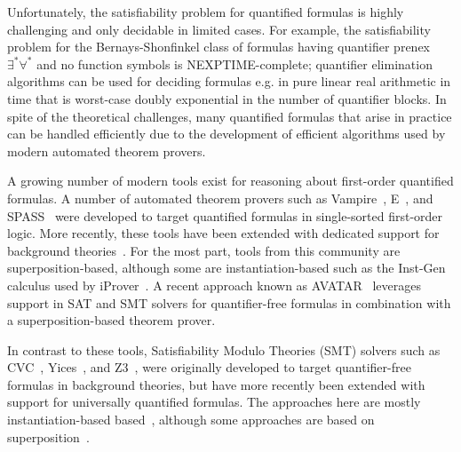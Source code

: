 \documentclass[oribibl]{llncs}
\begin{document}
Unfortunately, the satisfiability problem for quantified formulas is highly challenging 
and only decidable in limited cases.
For example,
the satisfiability problem for the Bernays-Shonfinkel class of formulas
having quantifier prenex $\exists^\ast \forall^\ast$ and no function symbols
is NEXPTIME-complete;
quantifier elimination algorithms can be used for deciding 
formulas e.g. in pure linear real arithmetic in time that is worst-case doubly exponential in the number of quantifier blocks.
In spite of the theoretical challenges, many quantified formulas that arise in practice
can be handled efficiently due to the development of efficient algorithms used by modern automated theorem provers.

A growing number of modern tools exist for reasoning about first-order quantified formulas.
A number of automated theorem provers
such as Vampire~\cite{DBLP:conf/cav/KovacsV13}, E~\cite{schulz2002brainiac}, and SPASS~\cite{weidenbach2009spass}
were developed to target quantified formulas in single-sorted first-order logic.
More recently, these tools have been extended with dedicated support for background theories~\cite{DBLP:conf/frocos/AlthausKW09,DBLP:conf/cade/BaumgartnerBW15}.
For the most part, tools from this community are superposition-based,
although some are instantiation-based such as the Inst-Gen calculus used by iProver~\cite{ganzinger2003new}.
A recent approach known as AVATAR~\cite{DBLP:conf/cade/RegerSV15} leverages support in SAT and SMT solvers for quantifier-free formulas
in combination with a superposition-based theorem prover.

In contrast to these tools, Satisfiability Modulo Theories (SMT) solvers such as CVC~\cite{stump2002cvc}, Yices~\cite{dutertre2006yices}, and Z3~\cite{Z3}, 
were originally developed to target quantifier-free formulas in background theories,
but have more recently been extended with support for universally quantified formulas.
The approaches here are mostly instantiation-based based~\cite{Detlefs03simplify:a,MouraBjoerner07,GeBarrettTinelli07},
although some approaches are based on superposition~\cite{de2008engineering}.
\end{document}
